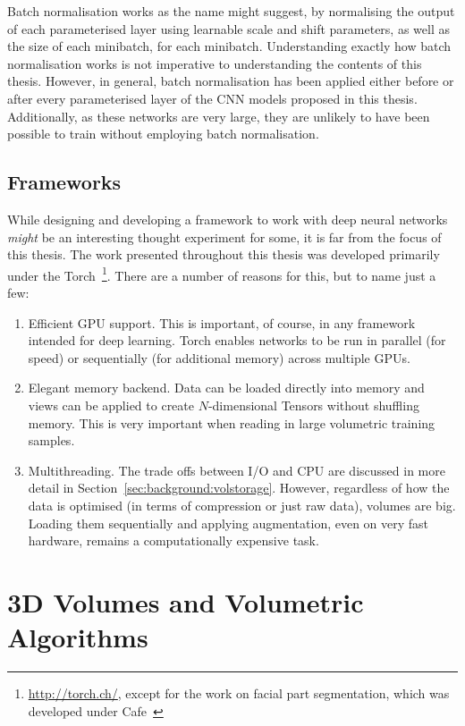 Batch normalisation works as the name might suggest, by normalising
the output of each parameterised layer using learnable scale and shift
parameters, as well as the size of each minibatch, for each
minibatch. Understanding exactly how batch normalisation works is not
imperative to understanding the contents of this thesis. However, in
general, batch normalisation has been applied either before or after
every parameterised layer of the CNN models proposed in this
thesis. Additionally, as these networks are very large, they are
unlikely to have been possible to train without employing batch
normalisation.


\subsection{Frameworks}

While designing and developing a framework to work with deep neural
networks \textit{might} be an interesting thought experiment for some,
it is far from the focus of this thesis. The work presented throughout
this thesis was developed primarily under the
Torch~\footnote{\url{http://torch.ch/}, except for the work on facial
  part segmentation, which was developed under
  Cafe~\cite{jia2014caffe}}. There are a number of reasons for this,
but to name just a few:

\begin{enumerate}
\item Efficient GPU support. This is important, of course, in any
  framework intended for deep learning. Torch enables networks to be
  run in parallel (for speed) or sequentially (for additional memory)
  across multiple GPUs.
\item Elegant memory backend. Data can be loaded directly into memory
  and views can be applied to create $N$-dimensional Tensors without
  shuffling memory. This is very important when reading in large
  volumetric training samples.
\item Multithreading. The trade offs between I/O and CPU are discussed
  in more detail in Section~\ref{sec:background:volstorage}. However,
  regardless of how the data is optimised (in terms of compression or
  just raw data), volumes are big. Loading them sequentially and
  applying augmentation, even on very fast hardware, remains a
  computationally expensive task.
\end{enumerate}


\section{3D Volumes and Volumetric Algorithms}
\label{sec:background:volumes}


